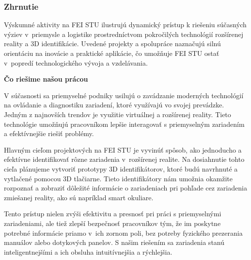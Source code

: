 

\subsubsection{Zhrnutie}

Výskumné aktivity na FEI STU ilustrujú dynamický prístup k riešeniu súčasných výziev v~priemysle a logistike prostredníctvom pokročilých technológií rozšírenej reality a 3D identifikácie. Uvedené projekty a spolupráce naznačujú silnú orientáciu na inovácie a praktické aplikácie, čo umožňuje FEI STU ostať v~popredí technologického vývoja a vzdelávania.

{\large\textbf{Čo riešime našou prácou}}

V súčasnosti sa priemyselné podniky usilujú o zavádzanie moderných technológií na ovládanie a diagnostiku zariadení, ktoré využívajú vo svojej prevádzke. Jedným z najnovších trendov je využitie virtuálnej a rozšírenej reality. Tieto technológie umožňujú pracovníkom lepšie interagovať s priemyselným zariadením a efektívnejšie riešiť problémy.

Hlavným cieľom projektových na FEI STU je vyvinúť spôsob, ako jednoducho a efektívne identifikovať rôzne zariadenia v~rozšírenej realite. Na dosiahnutie tohto cieľa plánujeme vytvoriť prototypy 3D identifikátorov, ktoré budú navrhnuté a vytlačené pomocou 3D tlačiarne. Tieto identifikátory nám umožnia okamžite rozpoznať a zobraziť dôležité informácie o zariadeniach pri pohľade cez zariadenia zmiešanej reality, ako sú napríklad smart okuliare.

Tento prístup nielen zvýši efektivitu a presnosť pri práci s priemyselnými zariadeniami, ale tiež zlepší bezpečnosť pracovníkov tým, že im poskytne potrebné informácie priamo v~ich zornom poli, bez potreby fyzického prezerania manuálov alebo dotykových panelov. S našim riešením sa zariadenia stanú inteligentnejšími a ich obsluha intuitívnejšia a rýchlejšia.

